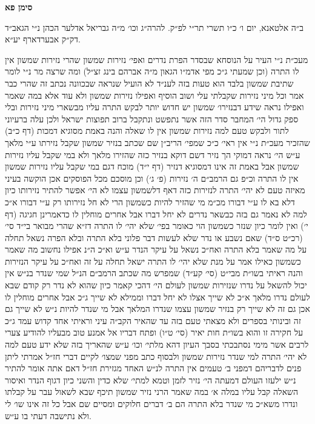 \documentclass[12pt, openany]{book}
\newcommand{\chapname}{}
\newcommand{\newchap}[1]{
	\addcontentsline{toc}{chapter}{#1}
	\renewcommand{\chapname}{#1}
		\begin{center}
			\textbf{%
\fontsize{16pt}{16pt}\selectfont
				#1}
		\end{center}
}
\begin{document}
\newchap{סימן פא}
\begin{multicols}{2}
ב״ה אלטאנא, יום ו׳ כ״ו תשרי תר״י לפ״ק. להרה״ג וכו׳ מ״ה גבריאל אדלער הכהן נ״י הגאב״ד דק״ק אבערדארף יע״א.\\\vspace{0pt}

מעכ״ת נ״י העיר על הנוסחא שבסדר הפרת נדרים ואפי׳ נזירות שמשון שהרי נזירות שמשון אין לו התרה (וכן שמעתי ג״כ מפי אדמ״ו הגאון מ״ה אברהם בינג זצ״ל) ומה שרצה מר נ״י לומר שתיבת שמשון בלבד הוא טעות בזה לענ״ד לא הועיל שנראה שבכוונה נכתב זה שהרי כבר אמר וכל מיני נזירות שקבלתי עלי ושוב הוסיף ואפילו נזירות שמשון ולא עוד אלא במה שאמר ואפילו נראה שידע דבנזירו׳ שמשון יש חדוש יותר לבקש התרה עליו מבשארי מיני נזירות ובלי ספק גדול הי׳ המחבר סדר הזה אשר נתפשט ונתקבל ברוב תפוצות ישראל ולכן עלה ברעיוני לתור ולבקש טעם למה נזירות שמשון אין לו שאלה והנה באמת מסוגיא דמכות (דף כ״ב) שהזכיר מעכ״ת נ״י אין ראי׳ כ״כ שמפי׳ הריב״ן שם שכתב בנזיר שמשון שקבל נזירתו ע״י מלאך ע״ש הי׳ נראה דמוקי הך נזיר דשם דוקא בנזיר כזה שהזירו מלאך ולא במי שקבל עליו נזירות שמשון אבל באמת זה אינו דמסוגיא דנזיר (דף י״ד) מוכח דגם במי שקבל עליו נזירות שמשון אין לו התרה וכ״פ גם הרמב״ם ה׳ נזירות (פ׳ ג׳) וכן מוסכם מכל הפוסקים אכן הוקשה בעיני מאיזה טעם לא יהי׳ התרה לנזירות כזה דאף דלשמשון עצמו לא הי׳ אפשר להתיר נזירותו כיון דלא בא לו ע״י דבורו מכ״מ מי שהזיר להיות כשמשון הרי לא חל נזירותו רק ע״י דבורו א״כ למה לא נאמר גם בזה כבשאר נדרים לא יחל דברו אבל אחרים מוחלין לו כדאמרינן חגיגה (דף י׳) ואין לומר כיון שנזר כשמשון הוי כאומר בפי׳ שלא יהי׳ לו התרה דז״א שהרי מבואר בי״ד סי׳ (רכ״ט ס״ד) שאם נשבע או נדר שלא לעשות דבר פלוני בלא התרה ובלא הפרה נשאל תחלה על מה שאמר בלא התרה ואח״כ נשאל על עיקר הנדר ע״ש וא״כ ה״נ אפילו נחשוב מה שאמר כשמשון כאילו אמר על מנת שלא יהי׳ לו התרה ישאל תחלה על זה ואח״כ על עיקר הנזירות והנה ראיתי בשו״ת מבי״ט (סי׳ קע״ד) שמפרש מה שכתב הרמב״ם הנ״ל שמי שנדר בנ״ש אין יכול להשאל על נדרו שנזירות שמשון לעולם הי׳ דהכי קאמר כיון שהוא לא נדר רק קודם שבא לעולם נדרו מלאך א״כ לא שייך אצלו לא יחל דברו וממילא לא שייך ג״כ אבל אחרים מוחלין לו אכן גם זה לא שייך רק בנזיר שמשון עצמו שנדרו המלאך אבל מי שנדר להיות נ״ש לא שייך גם זה ובינותי בספרים ולא מצאתי טעם בזה עד שהאיר הקב״ה עיני וראיתי אחד קדוש עמד ג״כ על חקירה זו והוא בשו״ת חות יאיר (סי׳ ט״ו) ופתח דבריו אל אמנע טוב מבעליו להודיע צערי לרבים אשר מימי נסתבכתי בסבך העיון דהא מלתי׳ וכו׳ ע״ש שהאריך בזה שלא ידע טעם למה לא יהי׳ התרה למי שנדר נזירות שמשון ולבסוף כתב מפני שמצו׳ לקיים דברי חז״ל אמרתי ליתן פנים לדבריהם דמפני ב׳ טעמים אין התרה לנ״ש האחד מגזירת חז״ל דאם אתה אומר להתיר נ״ש ילעזו העולם דמעתה הי׳ נזיר לזמן וטמא למתי׳ שלא כדין והשני כיון דגוף הנדר ואיסור השאלה קבל עליו במלה א׳ במה שאמר הרני נזיר שמשון תיכף שבא לשאול עבר על קבלתו ונדרו משא״כ מי שנדר בלא התרה הם ב׳ דברים חלוקים ומסיים שם אבל כל זה אינו שו׳ לי ולא נתישבה דעתי בו ע״ש.\\\vspace{0pt}


\end{multicols}
\end{document}
